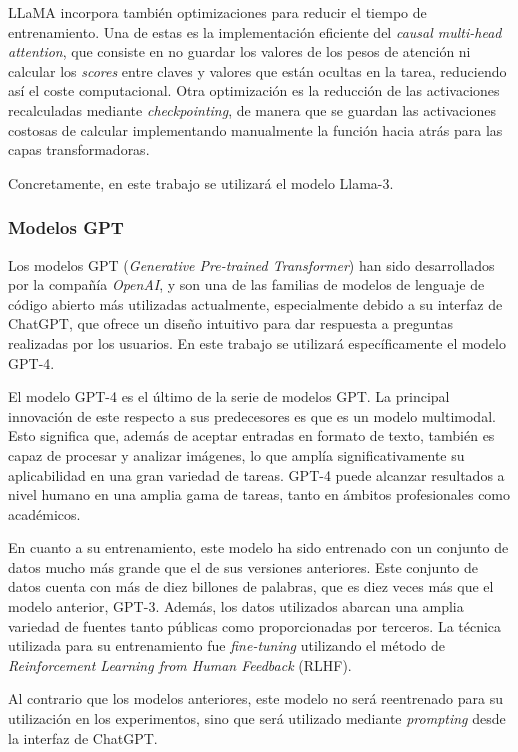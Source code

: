 \documentclass[11pt,spanish,listoffigures,listoftables]{tfgetsinf}
\begin{document}
LLaMA incorpora también optimizaciones para reducir el tiempo de entrenamiento. Una de estas es la implementación eficiente del \textit{causal multi-head attention}, que consiste en no guardar los valores de los pesos de atención ni calcular los \textit{scores} entre claves y valores que están ocultas en la tarea, reduciendo así el coste computacional. Otra optimización es la reducción de las activaciones recalculadas mediante \textit{checkpointing}, de manera que se guardan las activaciones costosas de calcular implementando manualmente la función hacia atrás para las capas transformadoras.

Concretamente, en este trabajo se utilizará el modelo Llama-3.

\subsubsection{Modelos GPT}

Los modelos GPT (\textit{Generative Pre-trained Transformer}) han sido desarrollados por la compañía \textit{OpenAI}, y son una de las familias de modelos de lenguaje de código abierto más utilizadas actualmente, especialmente debido a su interfaz de ChatGPT, que ofrece un diseño intuitivo para dar respuesta a preguntas realizadas por los usuarios. En este trabajo se utilizará específicamente el modelo GPT-4.

El modelo GPT-4 \cite{openai2024gpt4technicalreport} es el último de la serie de modelos GPT. La principal innovación de este respecto a sus predecesores es que es un modelo multimodal. Esto significa que, además de aceptar entradas en formato de texto, también es capaz de procesar y analizar imágenes, lo que amplía significativamente su aplicabilidad en una gran variedad de tareas. GPT-4 puede alcanzar resultados a nivel humano en una amplia gama de tareas, tanto en ámbitos profesionales como académicos.

En cuanto a su entrenamiento, este modelo ha sido entrenado con un conjunto de datos mucho más grande que el de sus versiones anteriores. Este conjunto de datos cuenta con más de diez billones de palabras, que es diez veces más que el modelo anterior, GPT-3. Además, los datos utilizados abarcan una amplia variedad de fuentes tanto públicas como proporcionadas por terceros. La técnica utilizada para su entrenamiento fue \textit{fine-tuning} utilizando el método de \textit{Reinforcement Learning from Human Feedback} (RLHF).

Al contrario que los modelos anteriores, este modelo no será reentrenado para su utilización en los experimentos, sino que será utilizado mediante \textit{prompting} desde la interfaz de ChatGPT.
\end{document}
